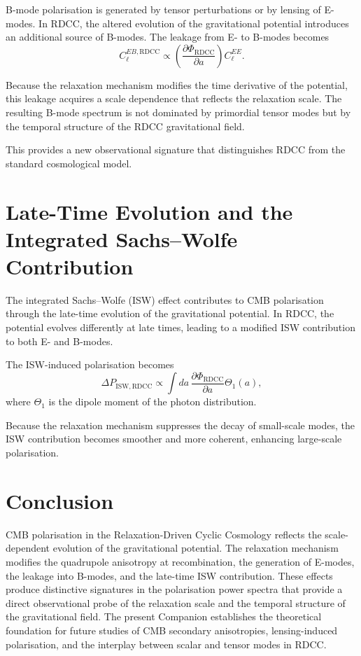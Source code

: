 \documentclass[11pt,a4paper]{article}
\begin{document}
B-mode polarisation is generated by tensor perturbations or by lensing of E-modes. 
In RDCC, the altered evolution of the gravitational potential introduces an 
additional source of B-modes. The leakage from E- to B-modes becomes
\begin{equation}
    C_{\ell}^{EB,\mathrm{RDCC}}
    \propto
    \left(
        \frac{\partial \Phi_{\mathrm{RDCC}}}{\partial a}
    \right)
    C_{\ell}^{EE}.
\end{equation}

Because the relaxation mechanism modifies the time derivative of the potential, 
this leakage acquires a scale dependence that reflects the relaxation scale. The 
resulting B-mode spectrum is not dominated by primordial tensor modes but by the 
temporal structure of the RDCC gravitational field.

This provides a new observational signature that distinguishes RDCC from the 
standard cosmological model.
\section{Late-Time Evolution and the Integrated Sachs--Wolfe Contribution}

The integrated Sachs--Wolfe (ISW) effect contributes to CMB polarisation through 
the late-time evolution of the gravitational potential. In RDCC, the potential 
evolves differently at late times, leading to a modified ISW contribution to both 
E- and B-modes.

The ISW-induced polarisation becomes
\begin{equation}
    \Delta P_{\mathrm{ISW,RDCC}}
    \propto
    \int da\,
    \frac{\partial \Phi_{\mathrm{RDCC}}}{\partial a}
    \Theta_{1}(a),
\end{equation}
where $\Theta_{1}$ is the dipole moment of the photon distribution.

Because the relaxation mechanism suppresses the decay of small-scale modes, the 
ISW contribution becomes smoother and more coherent, enhancing large-scale 
polarisation.
\section{Conclusion}

CMB polarisation in the Relaxation-Driven Cyclic Cosmology reflects the 
scale-dependent evolution of the gravitational potential. The relaxation mechanism 
modifies the quadrupole anisotropy at recombination, the generation of E-modes, 
the leakage into B-modes, and the late-time ISW contribution. These effects 
produce distinctive signatures in the polarisation power spectra that provide a 
direct observational probe of the relaxation scale and the temporal structure of 
the gravitational field. The present Companion establishes the theoretical 
foundation for future studies of CMB secondary anisotropies, lensing-induced 
polarisation, and the interplay between scalar and tensor modes in RDCC.
\end{document}
